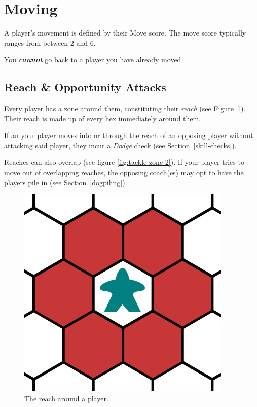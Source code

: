 \section{Moving} \label{moving}
A player's movement is defined by their Move score.
The move score typically ranges from between 2 and 6.

\begin{note}
    You \textit{\textbf{cannot}} go back to a player you have already moved.
\end{note}

\subsection{Reach \& Opportunity Attacks}
Every player has a zone around them, constituting their \textit{reach} (see Figure~\ref{fig:tackle-zone-1}).
Their reach is made up of every hex immediately around them.

If an your player moves into or through the reach of an opposing player without attacking said player, they incur a \textit{Dodge} check (see Section~\ref{skill-checks}).

\begin{note}
    Reaches can also overlap (see figure \ref{fig:tackle-zone-2}).
    If your player tries to move out of overlapping reaches, the opposing coach(es) may opt to have the players pile in (see Section~\ref{dogpiling}).
\end{note}

\begin{figure}
    \centering
    \includegraphics{graphics/tackle-zones-1.png}
    \caption{The reach around a player.}
    \label{fig:tackle-zone-1}
\end{figure}

